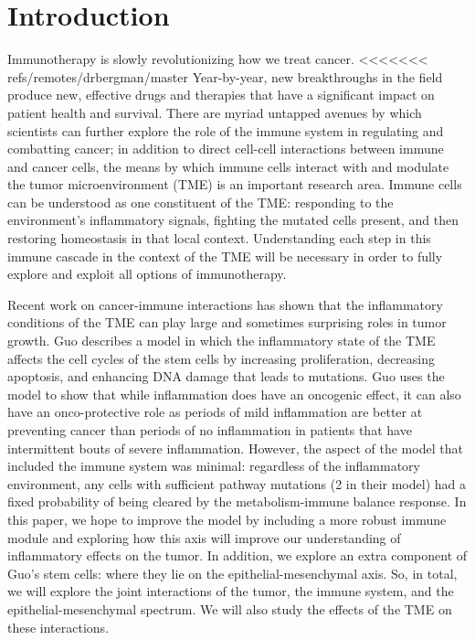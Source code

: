 \documentclass{article}
\begin{document}
\section{Introduction}
Immunotherapy is slowly revolutionizing how we treat cancer.
<<<<<<< refs/remotes/drbergman/master
Year-by-year, new breakthroughs in the field produce new, effective drugs and therapies that have a significant impact on patient health and survival\cite{pardoll2012blockade}\cite{restifo2012adoptive}.
There are myriad untapped avenues by which scientists can further explore the role of the immune system in regulating and combatting cancer; in addition to direct cell-cell interactions between immune and cancer cells, the means by which immune cells interact with and modulate the tumor microenvironment (TME) is an important research area. Immune cells can be understood as one constituent of the TME: responding to the environment's inflammatory signals, fighting the mutated cells present, and then restoring homeostasis in that local context\cite{de2006paradoxical}.
Understanding each step in this immune cascade in the context of the TME will be necessary in order to fully explore and exploit all options of immunotherapy.

Recent work on cancer-immune interactions has shown that the inflammatory conditions of the TME can play large and sometimes surprising roles in tumor growth.
Guo describes a model in which the inflammatory state of the TME affects the cell cycles of the stem cells by increasing proliferation, decreasing apoptosis, and enhancing DNA damage that leads to mutations\cite{guo2017multiscale}.
Guo uses the model to show that while inflammation does have an oncogenic effect, it can also have an onco-protective role as periods of mild inflammation are better at preventing cancer than periods of no inflammation in patients that have intermittent bouts of severe inflammation.
However, the aspect of the model that included the immune system was minimal: regardless of the inflammatory environment, any cells with sufficient pathway mutations (2 in their model) had a fixed probability of being cleared by the metabolism-immune balance response. 
In this paper, we hope to improve the model by including a more robust immune module and exploring how this axis will improve our understanding of inflammatory effects on the tumor.
In addition, we explore an extra component of Guo's stem cells: where they lie on the epithelial-mesenchymal axis.
So, in total, we will explore the joint interactions of the tumor, the immune system, and the epithelial-mesenchymal spectrum.
We will also study the effects of the TME on these interactions.
\end{document}
